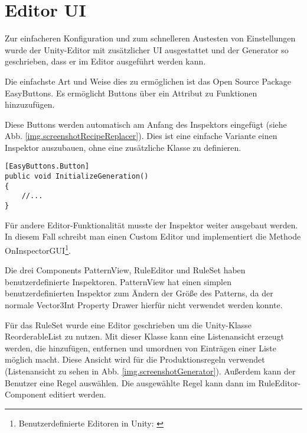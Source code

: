 
\section{Editor UI}\label{s.editorUI}

Zur einfacheren Konfiguration und zum schnelleren Austesten von Einstellungen wurde der Unity-Editor mit zusätzlicher UI ausgestattet und der Generator so geschrieben, dass er im Editor ausgeführt werden kann. 

Die einfachste Art und Weise dies zu ermöglichen ist das Open Source Package EasyButtons. Es ermöglicht Buttons über ein Attribut zu Funktionen hinzuzufügen.

Diese Buttons werden automatisch am Anfang des Inspektors eingefügt (siehe Abb. \ref{img.screenshotRecipeReplacer}). Dies ist eine einfache Variante einen Inspektor auszubauen, ohne eine zusätzliche Klasse zu definieren.

\begin{lstlisting}[label=l.buttonAttribute, caption={Beispiel eines EasyButtons-Attributs}] 
[EasyButtons.Button]
public void InitializeGeneration()
{
    //...
}
\end{lstlisting}


Für andere Editor-Funktionalität musste der Inspektor weiter ausgebaut werden. In diesem Fall schreibt man einen Custom Editor und implementiert die Methode OnInspectorGUI\footnote{Benutzerdefinierte Editoren in Unity: \cite[Seite: editor-CustomEditors]{unityManual}}.

Die drei Components PatternView, RuleEditor und RuleSet haben benutzerdefinierte Inspektoren. PatternView hat einen simplen benutzerdefinierten Inspektor zum Ändern der Größe des Patterns, da der normale Vector3Int Property Drawer hierfür nicht verwendet werden konnte. 

Für das RuleSet wurde eine Editor geschrieben um die Unity-Klasse ReorderableList zu nutzen. Mit dieser Klasse kann eine Listenansicht erzeugt werden, die hinzufügen, entfernen und umordnen von Einträgen einer Liste möglich macht. Diese Ansicht wird für die Produktionsregeln verwendet (Listenansicht zu sehen in Abb. \ref{img.screenshotGenerator}). Außerdem kann der Benutzer eine Regel auswählen. Die ausgewählte Regel kann dann im RuleEditor-Component editiert werden.


